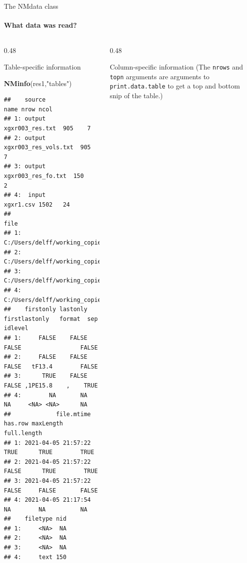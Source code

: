 \documentclass[
  8pt,
  ignorenonframetext,
  aspectratio=169]{beamer}
\newenvironment{Shaded}{\begin{snugshade}}{\end{snugshade}}
\newcommand{\KeywordTok}[1]{\textcolor[rgb]{0.13,0.29,0.53}{\textbf{#1}}}
\newcommand{\NormalTok}[1]{#1}
\newcommand{\StringTok}[1]{\textcolor[rgb]{0.31,0.60,0.02}{#1}}
\begin{document}
\begin{frame}[fragile]{The NMdata class}
\protect\hypertarget{the-nmdata-class-1}{}
\framesubtitle{What data was read?}

\begin{columns}[T]
\begin{column}{0.48\textwidth}
\begin{block}{Table-specific information}
\protect\hypertarget{table-specific-information}{}
\scriptsize

\begin{Shaded}
\begin{Highlighting}[]
\KeywordTok{NMinfo}\NormalTok{(res1,}\StringTok{"tables"}\NormalTok{)}
\end{Highlighting}
\end{Shaded}

\begin{verbatim}
##    source                 name nrow ncol
## 1: output      xgxr003_res.txt  905    7
## 2: output xgxr003_res_vols.txt  905    7
## 3: output   xgxr003_res_fo.txt  150    2
## 4:  input            xgxr1.csv 1502   24
##                                                                              file
## 1:      C:/Users/delff/working_copies/NMdata/inst/examples/nonmem/xgxr003_res.txt
## 2: C:/Users/delff/working_copies/NMdata/inst/examples/nonmem/xgxr003_res_vols.txt
## 3:   C:/Users/delff/working_copies/NMdata/inst/examples/nonmem/xgxr003_res_fo.txt
## 4:              C:/Users/delff/working_copies/NMdata/inst/examples/data/xgxr1.csv
##    firstonly lastonly firstlastonly   format  sep idlevel
## 1:     FALSE    FALSE         FALSE                 FALSE
## 2:     FALSE    FALSE         FALSE   tF13.4        FALSE
## 3:      TRUE    FALSE         FALSE ,1PE15.8    ,    TRUE
## 4:        NA       NA            NA     <NA> <NA>      NA
##             file.mtime has.row maxLength full.length
## 1: 2021-04-05 21:57:22    TRUE      TRUE        TRUE
## 2: 2021-04-05 21:57:22   FALSE      TRUE        TRUE
## 3: 2021-04-05 21:57:22   FALSE     FALSE       FALSE
## 4: 2021-04-05 21:17:54      NA        NA          NA
##    filetype nid
## 1:     <NA>  NA
## 2:     <NA>  NA
## 3:     <NA>  NA
## 4:     text 150
\end{verbatim}
\end{block}
\end{column}

\begin{column}{0.48\textwidth}
\begin{block}{Column-specific information}
\protect\hypertarget{column-specific-information}{}
(The \texttt{nrows} and \texttt{topn} arguments are arguments to
\texttt{print.data.table} to get a top and bottom snip of the table.)
\scriptsize


\end{block}
\end{column}
\end{columns}
\end{frame}
\end{document}
